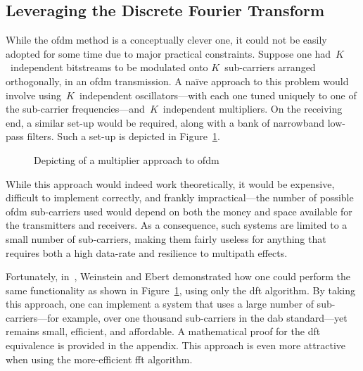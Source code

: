\documentclass[class=report,11pt,crop=false]{standalone}
\begin{document}
\subsection{Leveraging the Discrete Fourier Transform}
While the \gls{ofdm} method is a conceptually clever one, it could not be easily adopted for some time due to major practical constraints. Suppose one had~\(K\)~independent bitstreams to be modulated onto \(K\)~sub-carriers arranged orthogonally, in an \gls{ofdm} transmission. A na\"ive approach to this problem would involve using~\(K\)~independent oscillators---with each one tuned uniquely to one of the sub-carrier frequencies---and~\(K\)~independent multipliers. On the receiving end, a similar set-up would be required, along with a bank of narrowband low-pass filters. Such a set-up is depicted in Figure~\ref{fig:ofdm-multipliers}.
\begin{figure}
    \centering
    \captionsetup{type=figure}
    \def\svgwidth{0.90\linewidth}
    {
        \scriptsize
        
    }
    \caption{Depicting of a multiplier approach to \gls{ofdm}}
    \label{fig:ofdm-multipliers}
\end{figure}
While this approach would indeed work theoretically, it would be expensive, difficult to implement correctly, and frankly impractical---the number of possible \gls{ofdm} sub-carriers used would depend on both the money and space available for the transmitters and receivers. As a consequence, such systems are limited to a small number of sub-carriers, making them fairly useless for anything that requires both a high data-rate and resilience to multipath effects.

Fortunately, in~\cite{Weinstein1971}, Weinstein and Ebert demonstrated how one could perform the same functionality as shown in Figure~\ref{fig:ofdm-multipliers}, using only the \gls{dft} algorithm. By taking this approach, one can implement a system that uses a large number of sub-carriers---for example, over one thousand sub-carriers in the \gls{dab} standard---yet remains small, efficient, and affordable. A mathematical proof for the \gls{dft} equivalence is provided in the appendix. This approach is even more attractive when using the more-efficient \gls{fft} algorithm.
\end{document}
